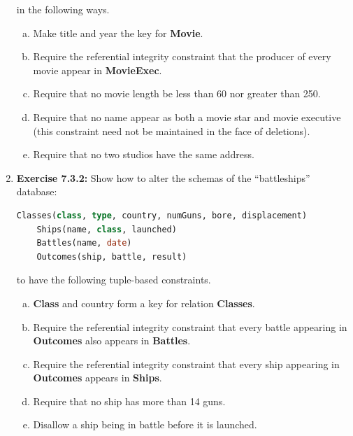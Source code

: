 \documentclass[12pt]{article}
\begin{document}
\begin{enumerate}[1.]
    \bigskip

    in the following ways.

    \bigskip

    \begin{enumerate}[a)]
        \item Make title and year the key for \textbf{Movie}.
        \item Require the referential integrity constraint that the producer of every movie appear in \textbf{MovieExec}.
        \item Require that no movie length be less than 60 nor greater than 250.
        \item Require that no name appear as both a movie star and movie executive (this constraint need not be maintained in the face of deletions).
        \item Require that no two studios have the same address.
    \end{enumerate}

    \item \textbf{Exercise 7.3.2:} Show how to alter the schemas of the “battleships”
    database:

    \bigskip

    \begin{lstlisting}[language=SQL]
    Classes(class, type, country, numGuns, bore, displacement)
    Ships(name, class, launched)
    Battles(name, date)
    Outcomes(ship, battle, result)
    \end{lstlisting}

    \bigskip

    to have the following tuple-based constraints.

    \bigskip

    \begin{enumerate}[a)]
        \item \textbf{Class} and country form a key for relation \textbf{Classes}.
        \item Require the referential integrity constraint that every battle appearing in \textbf{Outcomes} also appears in \textbf{Battles}.
        \item Require the referential integrity constraint that every ship appearing in \textbf{Outcomes} appears in \textbf{Ships}.
        \item Require that no ship has more than 14 guns.
        \item Disallow a ship being in battle before it is launched.
    \end{enumerate}


\end{enumerate}
\end{document}
